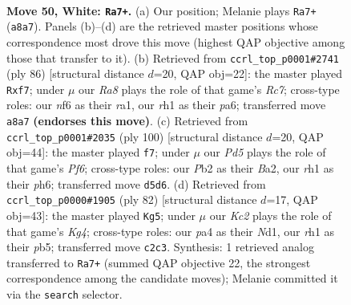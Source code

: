 \documentclass[11pt]{article}
\begin{document}
\clearpage

\begin{figure}[p]\centering
\begin{subfigure}{0.46\textwidth}\centering
\resizebox{\linewidth}{!}{%
\newchessgame
\chessboard[
  setfen={R7/5k2/5n2/1P1P4/p1p3P1/8/1PK5/7r w - - 11 50},
  showmover=false,
  pgfstyle=straightmove, color=movearrow, markmove={a8-a7}
]}
\caption{}
\end{subfigure}\hfill
\begin{subfigure}{0.46\textwidth}\centering
\resizebox{\linewidth}{!}{%
\newchessgame
\chessboard[
  setfen={8/2R2pp1/p7/4k1P1/P7/8/4PK2/r7 w - - 2 44},
  showmover=false,
  pgfstyle=straightmove, color=movearrow, markmove={c7-f7}
]}
\caption{}
\end{subfigure}
\\[4pt]
\begin{subfigure}{0.46\textwidth}\centering
\resizebox{\linewidth}{!}{%
\newchessgame
\chessboard[
  setfen={5r1k/p6n/5P1p/1p2R3/7P/6K1/BP6/8 w - - 1 51},
  showmover=false,
  pgfstyle=straightmove, color=movearrow, markmove={f6-f7}
]}
\caption{}
\end{subfigure}\hfill
\begin{subfigure}{0.46\textwidth}\centering
\resizebox{\linewidth}{!}{%
\newchessgame
\chessboard[
  setfen={2k5/2p5/6p1/1pn5/4PPK1/1P6/8/3N4 w - - 3 42},
  showmover=false,
  pgfstyle=straightmove, color=movearrow, markmove={g4-g5}
]}
\caption{}
\end{subfigure}
\caption{\textbf{Move 50, White: \texttt{Ra7+}.} (a) Our position; Melanie plays \texttt{Ra7+} (\texttt{a8a7}). Panels (b)--(d) are the retrieved master positions whose correspondence most drove this move (highest QAP objective among those that transfer to it). (b) Retrieved from \texttt{ccrl\_top\_p0001\#2741} (ply 86) [structural distance $d$=20, QAP obj=22]: the master played \texttt{Rxf7}; under $\mu$ our \emph{Ra8} plays the role of that game's \emph{Rc7}; cross-type roles: our \emph{n}f6 as their \emph{r}a1, our \emph{r}h1 as their \emph{p}a6; transferred move \texttt{a8a7} \textbf{(endorses this move)}. (c) Retrieved from \texttt{ccrl\_top\_p0001\#2035} (ply 100) [structural distance $d$=20, QAP obj=44]: the master played \texttt{f7}; under $\mu$ our \emph{Pd5} plays the role of that game's \emph{Pf6}; cross-type roles: our \emph{P}b2 as their \emph{B}a2, our \emph{r}h1 as their \emph{p}h6; transferred move \texttt{d5d6}. (d) Retrieved from \texttt{ccrl\_top\_p0000\#1905} (ply 82) [structural distance $d$=17, QAP obj=43]: the master played \texttt{Kg5}; under $\mu$ our \emph{Kc2} plays the role of that game's \emph{Kg4}; cross-type roles: our \emph{p}a4 as their \emph{N}d1, our \emph{r}h1 as their \emph{p}b5; transferred move \texttt{c2c3}. Synthesis: 1 retrieved analog transferred to \texttt{Ra7+} (summed QAP objective 22, the strongest correspondence among the candidate moves); Melanie committed it via the \texttt{search} selector.}
\label{fig:thought-m98}
\end{figure}
\end{document}
